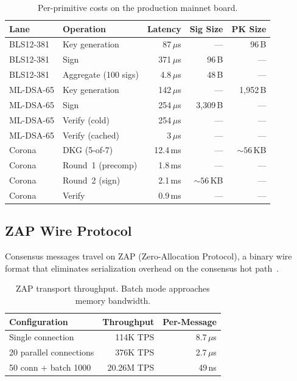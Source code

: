 \begin{table}[ht]
\centering
\small
\begin{tabular}{@{}llrrr@{}}
\toprule
\textbf{Lane} & \textbf{Operation} &
\textbf{Latency} & \textbf{Sig Size} & \textbf{PK Size} \\
\midrule
BLS12-381  & Key generation & 87\,$\mu$s   & ---       & 96\,B \\
BLS12-381  & Sign           & 371\,$\mu$s  & 96\,B     & --- \\
BLS12-381  & Aggregate (100 sigs) & 4.8\,$\mu$s & 48\,B & --- \\
\midrule
ML-DSA-65  & Key generation & 142\,$\mu$s  & ---       & 1{,}952\,B \\
ML-DSA-65  & Sign           & 254\,$\mu$s  & 3{,}309\,B & --- \\
ML-DSA-65  & Verify (cold)  & 254\,$\mu$s  & ---       & --- \\
ML-DSA-65  & Verify (cached) & 3\,$\mu$s    & ---       & --- \\
\midrule
Corona   & DKG (5-of-7)    & 12.4\,ms    & ---       & ${\sim}56$\,KB \\
Corona   & Round~1 (precomp) & 1.8\,ms    & ---       & --- \\
Corona   & Round~2 (sign)  & 2.1\,ms     & ${\sim}56$\,KB & --- \\
Corona   & Verify          & 0.9\,ms     & ---       & --- \\
\bottomrule
\end{tabular}
\caption{Per-primitive costs on the production mainnet board.}
\label{tab:primitives}
\end{table}

\subsection{ZAP Wire Protocol}

Consensus messages travel on ZAP (Zero-Allocation Protocol), a binary
wire format that eliminates serialization overhead on the consensus hot
path~\cite{lux-zap}.

\begin{table}[ht]
\centering
\small
\begin{tabular}{@{}lrr@{}}
\toprule
\textbf{Configuration} & \textbf{Throughput} & \textbf{Per-Message} \\
\midrule
Single connection       & 114K TPS    & 8.7\,$\mu$s \\
20 parallel connections & 376K TPS    & 2.7\,$\mu$s \\
50 conn + batch 1000    & 20.26M TPS  & 49\,ns \\
\bottomrule
\end{tabular}
\caption{ZAP transport throughput. Batch mode approaches memory
bandwidth.}
\label{tab:zap}
\end{table}

